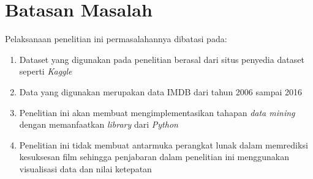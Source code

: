 \section{Batasan Masalah}
\label{sec:batasan} 
Pelaksanaan penelitian ini permasalahannya dibatasi pada: 

\begin{enumerate}
\item Dataset yang digunakan pada penelitian berasal dari situs penyedia dataset seperti \textit{Kaggle}
\item Data yang digunakan merupakan data IMDB dari tahun 2006 sampai 2016
\item Penelitian ini akan membuat mengimplementasikan tahapan \textit{data mining} dengan memanfaatkan \textit{library} dari \textit{Python}
\item Penelitian ini tidak membuat antarmuka perangkat lunak dalam memrediksi kesuksesan film sehingga penjabaran dalam penelitian ini menggunakan visualisasi data dan nilai ketepatan

\end{enumerate}



